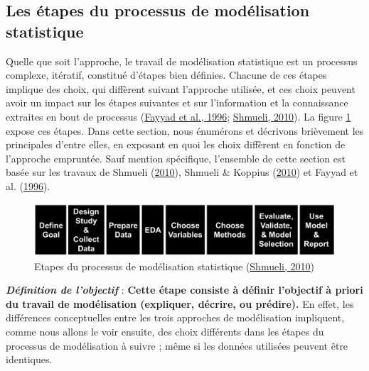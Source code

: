 \documentclass[12pt,twoside]{reedthesis}
\begin{document}
\hypertarget{steps-statistical-modeling}{%
\subsection{Les étapes du processus de modélisation statistique}\label{steps-statistical-modeling}}

Quelle que soit l'approche, le travail de modélisation statistique est un processus complexe, itératif, constitué d'étapes bien définies. Chacune de ces étapes implique des choix, qui diffèrent suivant l'approche utilisée, et ces choix peuvent avoir un impact sur les étapes suivantes et sur l'information et la connaissance extraites en bout de processus (\protect\hyperlink{ref-fayyad_data_nodate}{Fayyad et al., 1996}; \protect\hyperlink{ref-shmueli_explain_2010}{Shmueli, 2010}). La figure \ref{fig:modeling-steps} expose ces étapes. Dans cette section, nous énumérons et décrivons brièvement les principales d'entre elles, en exposant en quoi les choix diffèrent en fonction de l'approche empruntée. Sauf mention spécifique, l'ensemble de cette section est basée sur les travaux de Shmueli (\protect\hyperlink{ref-shmueli_explain_2010}{2010}), Shmueli \& Koppius (\protect\hyperlink{ref-shmueli_predictive_2010}{2010}) et Fayyad et al. (\protect\hyperlink{ref-fayyad_data_nodate}{1996}).\\
\begin{figure}

{\centering \includegraphics[width=1\linewidth]{figure/modeling_steps} 

}

\caption[Etapes du processus de modélisation statistique]{Etapes du processus de modélisation statistique (\protect\hyperlink{ref-shmueli_explain_2010}{Shmueli, 2010})}\label{fig:modeling-steps}
\end{figure}
\textbf{\emph{Définition de l'objectif}} : \textbf{Cette étape consiste à définir l'objectif à priori du travail de modélisation (expliquer, décrire, ou prédire).} En effet, les différences conceptuelles entre les trois approches de modélisation impliquent, comme nous allons le voir ensuite, des choix différents dans les étapes du processus de modélisation à suivre ; même si les données utilisées peuvent être identiques.\\
\end{document}

